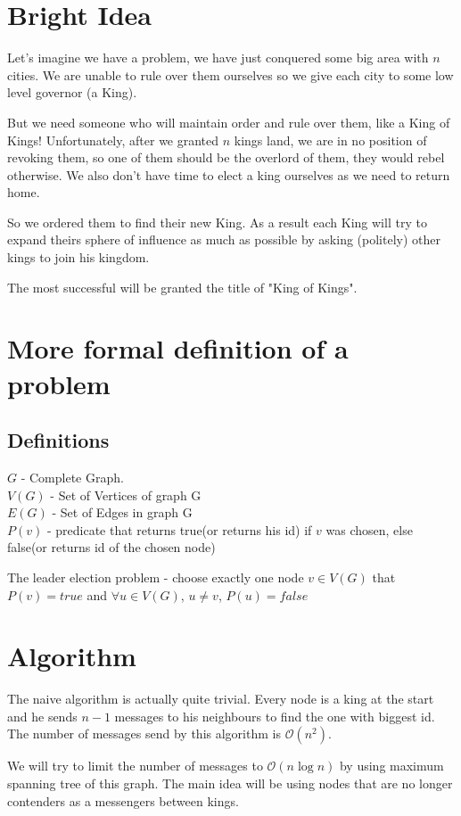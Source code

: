 \documentclass{article}
\begin{document}
\section*{Bright Idea}
Let's imagine we have a problem, we have just conquered some big area with \(n\) cities. We are unable to rule over them ourselves so we give each city to some low level governor (a King). 

But we need someone who will maintain order and rule over them, like a King of Kings! Unfortunately, after we granted \(n\) kings land, we are in no position of revoking them, so one of them should be the overlord of them, they would rebel otherwise. We also don't have time to elect a king ourselves as we need to return home.

So we ordered them to find their new King.
As a result each King will try to expand theirs sphere of influence as much as possible by asking (politely) other kings to join his kingdom.

The most successful will be granted the title of "King of Kings".

\section*{More formal definition of a problem}
\subsection*{Definitions}

    \(G\) - Complete Graph.\\
\(V(G)\) - Set of Vertices of graph G\\
\(E(G)\) - Set of Edges in graph G\\
\(P(v)\) - predicate that returns true(or returns his id) if \(v\) was chosen, else false(or returns id of the chosen node)

The leader election problem - choose exactly one node \(v \in V(G)\) that \(P(v) = true\) and \(\forall u \in V(G)\), \( u \ne v\), \(P(u) = false\) 

\section*{Algorithm}
The naive algorithm is actually quite trivial. Every node is a king at the start and he sends \(n - 1\) messages to his neighbours to find the one with biggest id. The number of messages send by this algorithm is \(\mathcal{O}(n^2)\).

We will try to limit the number of messages to \(\mathcal{O}(n \log n)\) by using maximum spanning tree of this graph. The main idea will be using nodes that are no longer contenders as a messengers between kings.
\end{document}
